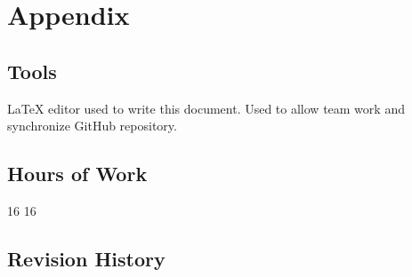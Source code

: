 \section{Appendix}
%
\subsection{Tools}
\begin{itemize}
	 \LaTeX{} editor used to write this document.
	 Used to allow team work and synchronize GitHub repository.
\end{itemize}
%
\subsection{Hours of Work}
\begin{itemize}
	 16
	 16
\end{itemize}
%
\subsection{Revision History}
%